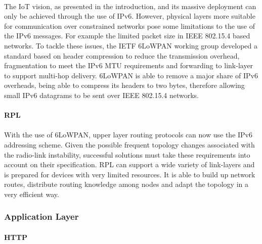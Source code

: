 \paragraph{}
	The \ac{IoT} vision, as presented in the introduction, and its massive deployment can only be achieved through the use of IPv6. However, physical layers more suitable for communication over constrained networks pose some limitations to the use of the IPv6 messages. For example the limited packet size in IEEE 802.15.4 based networks. To tackle these issues, the \ac{IETF} 6LoWPAN working group developed a standard based on header compression to reduce the transmission overhead, fragmentation to meet the IPv6 \ac{MTU} requirements and forwarding to link-layer to support multi-hop delivery. \cite{Hui2008}
	6LoWPAN is able to remove a major share of IPv6 overheads, being able to compress its headers to two bytes, therefore allowing small IPv6 datagrams to be sent over IEEE 802.15.4 networks. 
	
\paragraph{\textbf{RPL}}
\paragraph{}
With the use of 6LoWPAN, upper layer routing protocols can now use the IPv6 addressing scheme. Given the possible frequent topology changes associated with the radio-link instability, successful  solutions must take these requirements into account on their specification. RPL can support a wide variety of link-layers and is prepared for devices with very limited resources. It is able to build up network routes, distribute routing knowledge among nodes and adapt the topology in a very efficient way.

\subsubsection{Application Layer}

\paragraph{\textbf{\ac{HTTP}}}
